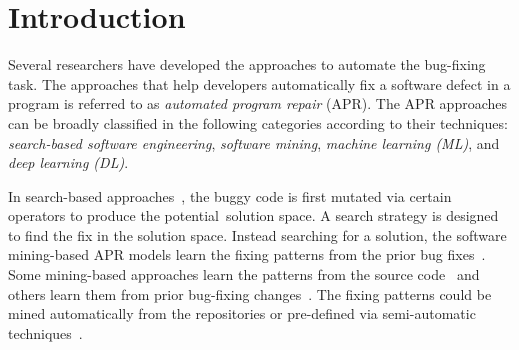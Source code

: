 \section{Introduction}


Several researchers have developed the approaches to automate the
bug-fixing task. The approaches that help
developers automatically fix a software defect in a program is
referred to as {\em automated program repair} (APR). The APR
approaches can be broadly classified in the following categories
according to their techniques:
{\em search-based software engineering}, {\em software mining}, {\em
  machine learning (ML)}, and {\em deep learning (DL)}.

In search-based
approaches~\cite{LeGoues-icse12,le2011genprog,martinez2016astor,qi2014strength},
the buggy code is first mutated via certain operators to produce the
potential~solution space. A search strategy is designed to find
the fix in the solution space. Instead searching for a solution, the
software mining-based APR models learn the fixing patterns from
the prior bug
fixes~\cite{kim2013automatic,le2016history,liu2019avatar,tbar-issta19,nguyen2013semfix,
  icse10,ray-fse12}. Some mining-based approaches learn the patterns
from the source code~\cite{liu2019avatar,tbar-issta19} and others
learn them from prior bug-fixing
changes~\cite{wen2018context,Simfix,koyuncu2018fixminer}.  The fixing
patterns could be mined automatically from the repositories
or pre-defined via semi-automatic
techniques~\cite{le2016history,nguyen2013semfix,liu2019avatar,tbar-issta19}.

